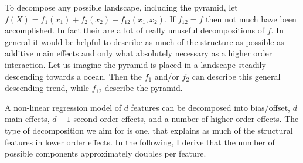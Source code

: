 To decompose any possible landscape, including the pyramid, let 
$f(X)= f_1(x_1) + f_2(x_2) + f_12(x_1,x_2)$. If $f_{12} = f$ then not much have been accomplished. In fact their are a lot of really unuseful decompositions of $f$. In general it would be helpful to describe as much of the structure as possible as additive main effects and only what absolutely necessary as a higher order interaction. Let us imagine the pyramid is placed in a landscape steadily descending towards a ocean. Then the $f_1$ and/or $f_2$ can describe this general descending trend, while $f_12$ describe the pyramid.

A non-linear regression model of $d$ features can be decomposed into bias/offset, $d$ main effects, $d-1$ second order effects, and a number of higher order effects. The type of decomposition we aim for is one, that explains as much of the structural features in lower order effects. In the following, I derive that the number of possible components approximately doubles per feature.

